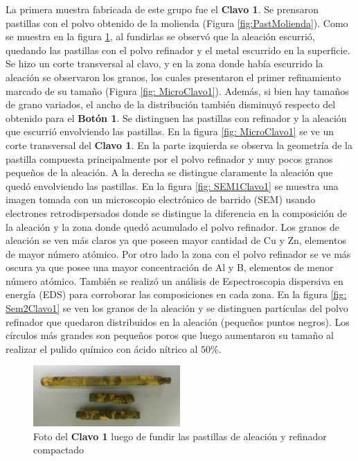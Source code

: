 \documentclass[a4paper,12pt,fleqn,twoside,openany]{book}
\begin{document}
La primera muestra fabricada de este grupo fue el \textbf{Clavo 1}. Se prensaron pastillas con el polvo obtenido de la molienda (Figura \ref{fig:PastMolienda}). Como se muestra en la figura \ref{fig: Clavo1}, al fundirlas se observó que la aleación escurrió, quedando las pastillas con el polvo refinador y el metal escurrido en la superficie. Se hizo un corte transversal al clavo, y en la zona donde había escurrido la aleación se observaron los granos, los cuales presentaron el primer refinamiento marcado de su tamaño (Figura \ref{fig: MicroClavo1}). Además, si bien hay tamaños de grano variados, el ancho de la distribución también disminuyó respecto del obtenido para el \textbf{Botón 1}.  Se distinguen las pastillas con refinador y la aleación que escurrió envolviendo las pastillas. En la figura \ref{fig: MicroClavo1} se ve un corte transversal del \textbf{Clavo 1}. En la parte izquierda se observa la geometría de la pastilla compuesta principalmente por el polvo refinador y muy pocos granos pequeños de la aleación. A la derecha se distingue claramente la aleación que quedó envolviendo las pastillas. En la figura \ref{fig: SEM1Clavo1} se muestra una imagen tomada con un microscopio electrónico de barrido (SEM) usando electrones retrodispersados donde se distingue la diferencia en la composición de la aleación y la zona donde quedó acumulado el polvo refinador. Los granos de aleación se ven más claros ya que poseen mayor cantidad de Cu y Zn, elementos de mayor número atómico. Por otro lado la zona con el polvo refinador se ve más oscura ya que posee una mayor concentración de Al y B, elementos de menor número atómico. También se realizó un análisis de Espectroscopia dispersiva en energía (EDS) para corroborar las composiciones en cada zona. En la figura \ref{fig: Sem2Clavo1} se ven los granos de la aleación y se distinguen partículas del polvo refinador que quedaron distribuidos en la aleación (pequeños puntos negros). Los círculos más grandes son pequeños poros que luego aumentaron su tamaño al realizar el pulido químico con ácido nítrico al $50 \%$.



 \begin{figure}
 \centering
 \includegraphics[width=0.5\textwidth]{Img/Resultados/clavos/Clavo1_Foto2.jpg}
 \caption{Foto del \textbf{Clavo 1} luego de fundir las pastillas de aleación y refinador compactado} 
 \label{fig: Clavo1}
 \end{figure}
\end{document}
